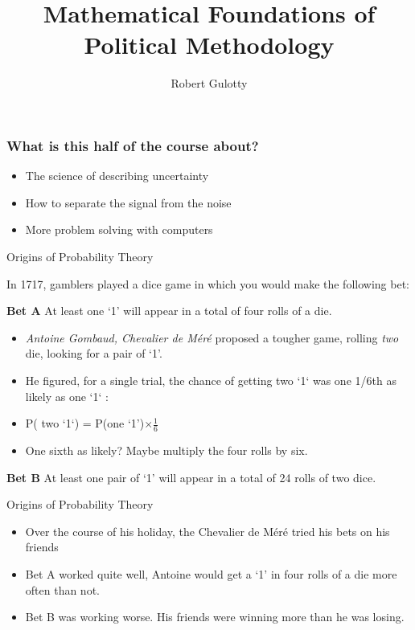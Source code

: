 \documentclass{beamer}
\title[PLSC 43401]{Mathematical Foundations of Political Methodology}
\author{Robert Gulotty}
\institute[Chicago]{University of Chicago}
\numberwithin{equation}{section}
\begin{document}
\begin{frame}
\maketitle
\end{frame}
\begin{frame}
\frametitle{What is this half of the course about?}
\begin{itemize}
\item The science of describing uncertainty
\item How to separate the signal from the noise
\item More problem solving with computers
\end{itemize}
\end{frame}






\begin{frame}{Origins of Probability Theory}

In 1717, gamblers played a dice game in which you would make the following bet:
\begin{tcolorbox}
\textbf{Bet A} At least one `1' will appear in a total of four rolls of a die.\\
\end{tcolorbox}
\pause
\begin{itemize}
\item \emph{Antoine Gombaud, Chevalier de M\'{e}r\'{e}} proposed a tougher game, rolling \emph{two} die, looking for a pair of `1'.\\
\pause
\item He figured, for a single trial, the chance of getting two `1` was one 1/6th as likely as one `1` : \pause
\item[$\rightarrow$] P( two `1`) =  P(one `1')$\times\frac{1}{6}$
\pause
\item One sixth as likely?  Maybe multiply the four rolls by six.
\pause  
\end{itemize}
\begin{tcolorbox}
\textbf{Bet B}  At least one pair of `1' will appear in a total of 24 rolls of two dice.
\end{tcolorbox}
\end{frame}

\begin{frame}{Origins of Probability Theory}

\begin{itemize}
\item Over the course of his holiday, the Chevalier de M\'{e}r\'{e} tried his bets on his friends 
\item Bet A worked quite well, Antoine would get a `1' in four rolls of a die more often than not. \pause
\item Bet B was working worse. His friends were winning more than he was losing.
\end{itemize}
\end{frame}
\end{document}
